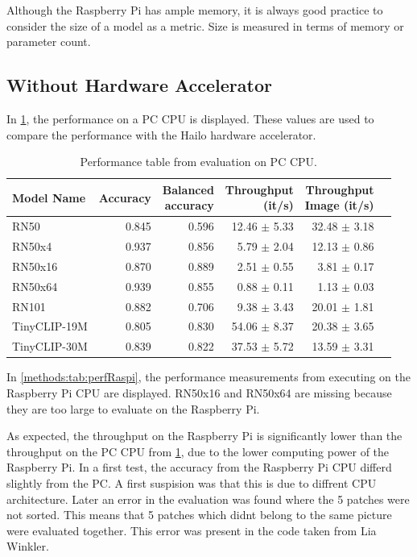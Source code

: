 Although the Raspberry Pi has ample memory, it is always good practice to consider the size of a model as a metric. Size is measured in terms of memory or parameter count.

\subsection{Without Hardware Accelerator}
In \cref{methods:tab:perfPC}, the performance on a PC CPU is displayed. These values are used to compare the performance with the Hailo hardware accelerator.

\begin{table}[tbp]
    \centering
    \begin{tabular}{l|rrrrr}
    \hline
        Model Name & Accuracy & \makecell{Balanced \\accuracy}&\makecell{Throughput\\(it/s)} & \makecell{Throughput \\ Image (it/s)} \\ \hline
        RN50 & 0.845& 0.596& 12.46 $\pm$ 5.33& 32.48 $\pm$ 3.18 \\ 
        RN50x4 & 0.937& 0.856& 5.79 $\pm$ 2.04& 12.13 $\pm$ 0.86 \\ 
        RN50x16 & 0.870& 0.889& 2.51 $\pm$ 0.55& 3.81 $\pm$ 0.17 \\ 
        RN50x64 & 0.939& 0.855& 0.88 $\pm$ 0.11& 1.13 $\pm$ 0.03\\
        RN101 & 0.882& 0.706& 9.38 $\pm$ 3.43& 20.01 $\pm$ 1.81\\  
        TinyCLIP-19M & 0.805& 0.830&54.06 $\pm$ 8.37& 20.38 $\pm$ 3.65 \\ 
        TinyCLIP-30M & 0.839& 0.822&37.53 $\pm$ 5.72& 13.59 $\pm$ 3.31 \\ 
    \end{tabular}
    \caption{Performance table from evaluation on PC CPU.}
    \label{methods:tab:perfPC}
\end{table}

In \cref{methods:tab:perfRaspi}, the performance measurements from executing on the Raspberry Pi CPU are displayed. RN50x16 and RN50x64 are missing because they are too large to evaluate on the Raspberry Pi.

As expected, the throughput on the Raspberry Pi is significantly lower than the throughput on the PC CPU from \cref{methods:tab:perfPC}, due to the lower computing power of the Raspberry Pi. In a first test, the accuracy from the Raspberry Pi CPU differd slightly from the PC.
A first suspision was that this is due to diffrent CPU architecture.
Later an error in the evaluation was found where the 5 patches were not sorted.
This means that 5 patches which didnt belong to the same picture were evaluated together.
This error was present in the code taken from Lia Winkler.

